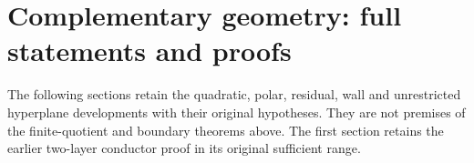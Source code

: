 


\tableofcontents

\section*{Complementary geometry: full statements and proofs}
The following sections retain the quadratic, polar, residual, wall and
unrestricted hyperplane developments with their original hypotheses.
They are not premises of the finite-quotient and boundary theorems above.
The first section retains the earlier two-layer conductor proof in its
original sufficient range.












\appendix









